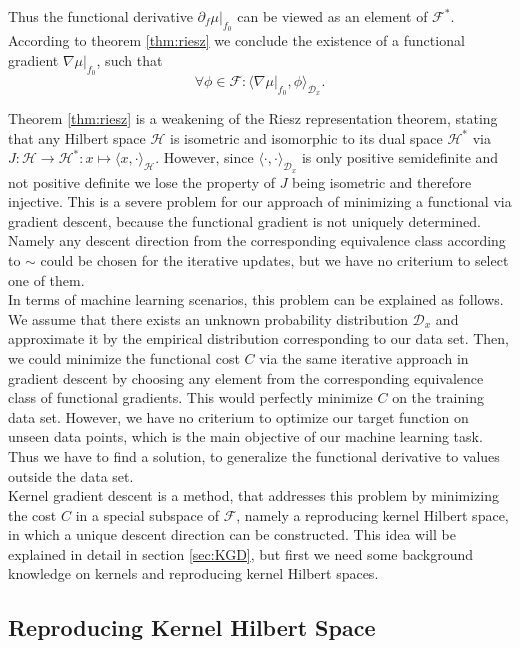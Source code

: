 \documentclass[11pt, a4paper]{article}
\newcommand{\D}{\mathcal{D}}
\newcommand{\F}{\mathcal{F}}
\renewcommand{\H}{\mathcal{H}}
\begin{document}
Thus the functional derivative $\partial_f \mu |_{f_0}$ can be viewed as an element of $\F^*$. According to theorem \ref{thm:riesz} we conclude the existence of a functional gradient $\nabla \mu |_{f_0}$, such that
\[ \forall \phi \in \F: \big \langle \nabla \mu |_{f_0}, \phi \big \rangle_{\D_x}. \]

Theorem \ref{thm:riesz} is a weakening of the Riesz representation theorem, stating that any Hilbert space $\H$ is isometric and isomorphic to its dual space $\H^*$ via  $J:\H \to \H^* : x \mapsto \langle x , \cdot \rangle_\H$. However, since $\langle \cdot , \cdot \rangle_{\D_x}$ is only positive semidefinite and not positive definite we lose the property of $J$ being isometric and therefore injective. This is a severe problem for our approach of minimizing a functional via gradient descent, because the functional gradient is not uniquely determined. Namely any descent direction from the corresponding equivalence class according to $\sim$ could be chosen for the iterative updates, but we have no criterium to select one of them. \\

In terms of machine learning scenarios, this problem can be explained as follows. We assume that there exists an unknown probability distribution $\D_x$ and approximate it by the empirical distribution corresponding to our data set. Then, we could minimize the functional cost $C$ via the same iterative approach in gradient descent by choosing any element from the corresponding equivalence class of functional gradients. This would perfectly minimize $C$ on the training data set. However, we have no criterium to optimize our target function on unseen data points, which is the main objective of our machine learning task. Thus we have to find a solution, to generalize the functional derivative to values outside the data set.  \\

Kernel gradient descent is a method, that addresses this problem by minimizing the cost $C$ in a special subspace of $\F$, namely a reproducing kernel Hilbert space, in which a unique descent direction can be constructed. This idea will be explained in detail in section \ref{sec:KGD}, but first we need some background knowledge on kernels and reproducing kernel Hilbert spaces. 

\subsection{Reproducing Kernel Hilbert Space}
\end{document}
